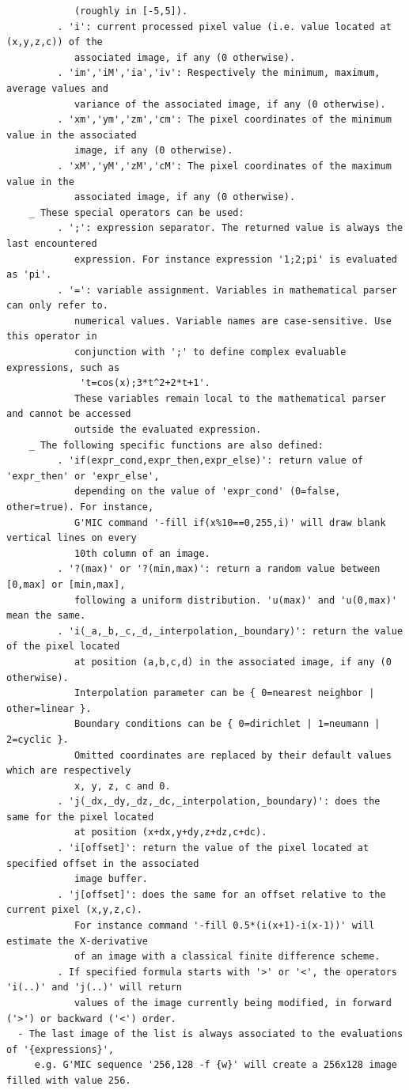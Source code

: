 \documentclass[a4paper,11pt,twoside]{book}
\begin{document}
\begin{lstlisting}
            (roughly in [-5,5]). 
         . 'i': current processed pixel value (i.e. value located at (x,y,z,c)) of the 
            associated image, if any (0 otherwise). 
         . 'im','iM','ia','iv': Respectively the minimum, maximum, average values and 
            variance of the associated image, if any (0 otherwise). 
         . 'xm','ym','zm','cm': The pixel coordinates of the minimum value in the associated 
            image, if any (0 otherwise). 
         . 'xM','yM','zM','cM': The pixel coordinates of the maximum value in the 
            associated image, if any (0 otherwise). 
    _ These special operators can be used: 
         . ';': expression separator. The returned value is always the last encountered 
            expression. For instance expression '1;2;pi' is evaluated as 'pi'. 
         . '=': variable assignment. Variables in mathematical parser can only refer to. 
            numerical values. Variable names are case-sensitive. Use this operator in 
            conjunction with ';' to define complex evaluable expressions, such as 
             't=cos(x);3*t^2+2*t+1'. 
            These variables remain local to the mathematical parser and cannot be accessed 
            outside the evaluated expression. 
    _ The following specific functions are also defined: 
         . 'if(expr_cond,expr_then,expr_else)': return value of 'expr_then' or 'expr_else', 
            depending on the value of 'expr_cond' (0=false, other=true). For instance, 
            G'MIC command '-fill if(x%10==0,255,i)' will draw blank vertical lines on every 
            10th column of an image. 
         . '?(max)' or '?(min,max)': return a random value between [0,max] or [min,max], 
            following a uniform distribution. 'u(max)' and 'u(0,max)' mean the same. 
         . 'i(_a,_b,_c,_d,_interpolation,_boundary)': return the value of the pixel located 
            at position (a,b,c,d) in the associated image, if any (0 otherwise). 
            Interpolation parameter can be { 0=nearest neighbor | other=linear }. 
            Boundary conditions can be { 0=dirichlet | 1=neumann | 2=cyclic }. 
            Omitted coordinates are replaced by their default values which are respectively 
            x, y, z, c and 0. 
         . 'j(_dx,_dy,_dz,_dc,_interpolation,_boundary)': does the same for the pixel located 
            at position (x+dx,y+dy,z+dz,c+dc). 
         . 'i[offset]': return the value of the pixel located at specified offset in the associated 
            image buffer. 
         . 'j[offset]': does the same for an offset relative to the current pixel (x,y,z,c). 
            For instance command '-fill 0.5*(i(x+1)-i(x-1))' will estimate the X-derivative 
            of an image with a classical finite difference scheme. 
         . If specified formula starts with '>' or '<', the operators 'i(..)' and 'j(..)' will return 
            values of the image currently being modified, in forward ('>') or backward ('<') order. 
  - The last image of the list is always associated to the evaluations of '{expressions}', 
     e.g. G'MIC sequence '256,128 -f {w}' will create a 256x128 image filled with value 256.
\end{lstlisting}
\normalsize
\end{document}
